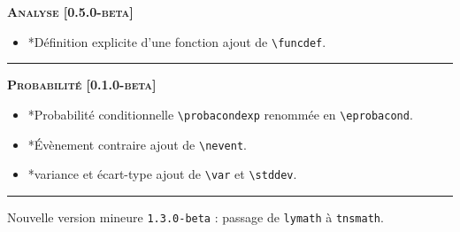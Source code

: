 \documentclass[12pt,a4paper]{book}
\makeatletter
\newcommand\env[1]{\texttt{#1}}
\newcommand\macro[1]{\env{\textbackslash{}#1}}
\theoremstyle{definition}
\newcommand\separation{
	\medskip
	\hfill\rule{0.5\textwidth}{0.75pt}\hfill
	\medskip
}
\newcommand\topic{\@ifstar{\@topic@star}{\@topic@no@star}}
\newcommand\@topic@no@star[1]{%
	\textbf{\textsc{#1}.}%
}
\newcommand\@topic@star[1]{%
	\textbf{\textsc{#1} :}%
}
\makeatother
\begin{document}
{{\begin{description}
    
    
    
    \begin{center}
        \textbf{\textsc{Analyse [0.5.0-beta]}}
    \end{center}
    
    \begin{itemize}[itemsep=.5em]
        \item \topic*{Définition explicite d'une fonction}
              ajout de \macro{funcdef}.
    
        
    \end{itemize}
    
    
    \separation
    
    
    
    
    \begin{center}
        \textbf{\textsc{Probabilité [0.1.0-beta]}}
    \end{center}
    
    \begin{itemize}[itemsep=.5em]
        \item \topic*{Probabilité conditionnelle}
              \macro{probacondexp} renommée en  \macro{eprobacond}.
    
    
        
    
        \item \topic*{Évènement contraire}
              ajout de \macro{nevent}.
    
    
        
    
        \item \topic*{variance et écart-type}
              ajout de \macro{var} et \macro{stddev}.
    
    
        
    
    \end{itemize}
    
    
    \separation


    \medskip
    \item[2020-07-21] Nouvelle version mineure \verb+1.3.0-beta+ : passage de \verb#lymath# à \verb#tnsmath#.
    
    
    

\end{description}}}
\end{document}
